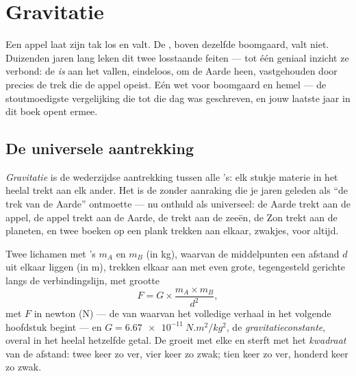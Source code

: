 \chapter{Gravitatie}\label{ch:g9:gravitation}

Een appel laat zijn tak los en valt. De , boven
dezelfde boomgaard, valt niet. Duizenden jaren lang leken dit twee
losstaande feiten --- tot één geniaal inzicht ze verbond: de
 \emph{is} aan het vallen, eindeloos, om de Aarde heen,
vastgehouden door precies de trek die de appel opeist. Eén wet voor
boomgaard en hemel --- de stoutmoedigste vergelijking die tot die dag
was geschreven, en jouw laatste jaar in dit boek opent ermee.

\section{De universele aantrekking}

\begin{definition}[Gravitatie]\label{def:g9:gravitation:gravitation}
\emph{Gravitatie} is de wederzijdse aantrekking
tussen alle 's: elk stukje materie in het heelal trekt aan elk
ander. Het is de  zonder aanraking die je jaren geleden als
``de trek van de Aarde'' ontmoette --- nu onthuld als universeel: de
Aarde trekt aan de appel, de appel trekt aan de Aarde, de
 trekt aan de zeeën, de Zon trekt aan de
planeten, en twee boeken op een plank trekken aan elkaar,
zwakjes, voor altijd.
\end{definition}

\begin{proposition}\label{prop:g9:gravitation:law}
Twee lichamen met 's $m_A$ en $m_B$ (in \unit{kg}), waarvan de
middelpunten een afstand $d$ uit elkaar liggen (in \unit{m}),
trekken elkaar aan met even grote, tegengesteld gerichte
 langs de verbindingslijn, met grootte
\[
F = G \times \frac{m_A \times m_B}{d^2},
\]
met $F$ in newton (\unit{N}) --- de  van
 waarvan het volledige verhaal in het volgende hoofdstuk
begint --- en $G = \qty{6.67e-11}{N.m^2/kg^2}$, de
\emph{gravitatieconstante}, overal in het heelal hetzelfde getal. De
 groeit met elke  en sterft met het
\emph{kwadraat} van de afstand: twee keer zo ver, vier keer zo zwak;
tien keer zo ver, honderd keer zo zwak.
\end{proposition}

